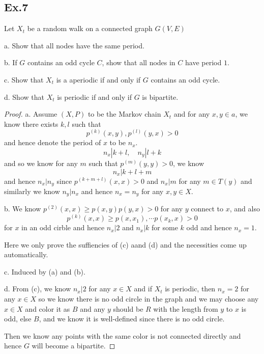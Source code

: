 \documentclass[lang=en,11pt,a4paper,citestyle =authoryear]{elegantpaper}
\begin{document}
\subsection*{Ex.7}
Let $X_t$ be a random walk on a connected graph $G(V,E)$\par
a. Show that all nodes have the same period.\par
b. If $G$ contains an odd cycle $C$, show that all nodes in $C$ have period $1$.\par
c. Show that $X_t$ is a aperiodic if and only if $G$ contains an odd cycle.\par
d. Show that $X_t$ is periodic if and only if $G$ is bipartite.
\begin{proof}
    a. Assume $(X,P)$ to be the Markov chain $X_t$ and for any $x,y\in a$, we know there exists $k,l$ such that
    \[p^{(k)}(x,y), p^{(l)}(y,x) > 0\]
    and hence denote the period of $x$ to be $n_x$.
    \[n_x | k+l,\quad n_y | l+k\]
    and so we know for any $m$ such that $p^{(m)}(y,y) > 0$, we know
    \[
    n_x | k+l+m
    \]
    and hence $n_x|n_y$ since $p^{(k+m+l)}(x,x) > 0$ and $n_x|m$ for any $m \in T(y)$ and similarly we know $n_y | n_x$ and hence $n_x = n_y$ for any $x,y\in X$.\par
    b. We know $p^{(2)}(x,x) \geq p(x,y)p(y,x) > 0$ for any $y$ connect to $x$, and also \[p^{(k)}(x,x) \geq p(x,x_1),\cdots p(x_k,x)>0\] for $x$ in an odd cirble and hence $n_x|2$ and $n_x|k$ for some $k$ odd and hence $n_x = 1$.\par
    Here we only prove the suffiencies of (c) aand (d) and the necessities come up automatically.\par
    c. Induced by (a) and (b).\par
    d. From (c), we know $n_x | 2$ for any $x\in X$ and if $X_t$ is periodic, then $n_x = 2$ for any $x\in X$ so we know there is no odd circle in the graph and we may choose any $x\in X$ and color it as $B$ and any $y$ should be $R$ with the length from $y$ to $x$ is odd, else $B$, and we know it is well-defined since there is no odd circle.\par
    Then we know any points with the same color is not connected directly and hence $G$ will become a bipartite.
\end{proof}
\end{document}
